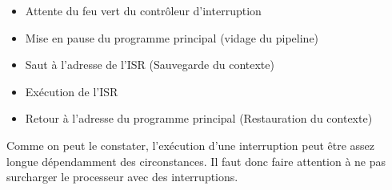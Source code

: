 \begin{itemize}
\item Attente du feu vert du contrôleur d'interruption
\item Mise en pause du programme principal (vidage du pipeline)
\item Saut à l'adresse de l'ISR (Sauvegarde du contexte)
\item Exécution de l'ISR
\item Retour à l'adresse du programme principal (Restauration du contexte)
\end{itemize}

Comme on peut le constater, l'exécution d'une interruption peut être assez longue dépendamment des circonstances. Il faut donc faire attention à ne pas surcharger le processeur avec des interruptions.
